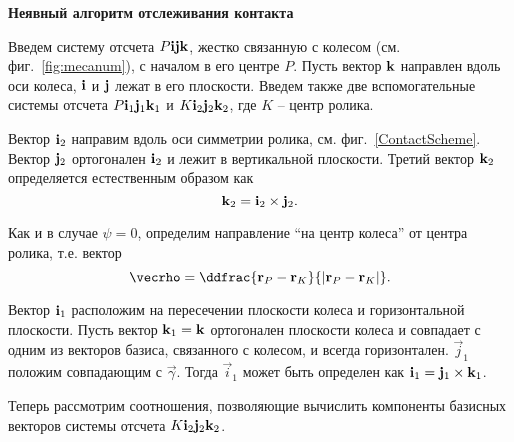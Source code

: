 \textbf{Неявный алгоритм отслеживания контакта}

Введем систему отсчета $P{\bf i}{\bf j}{\bf k}$, жестко связанную с колесом (см. фиг.~\ref{fig:mecanum}), с началом в его центре $P$. Пусть вектор ${\bf k}$ направлен вдоль оси колеса, ${\bf i}$ и ${\bf j}$ лежат в его плоскости. Введем также две вспомогательные системы отсчета $P{\bf i}_1{\bf j}_1{\bf k}_1$ и $K{\bf i}_2{\bf j}_2{\bf k}_2$, где $K$ -- центр ролика.

Вектор ${\bf i}_2$ направим вдоль оси симметрии ролика, см. фиг.~\ref{ContactScheme}. Вектор ${\bf j}_2$ ортогонален ${\bf i}_2$ и лежит в вертикальной плоскости. Третий вектор ${\bf k}_2$ определяется естественным образом как
$$
{\bf k}_2={\bf i}_2\times {\bf j}_2.
$$



Как и в случае $\psi = 0$, определим направление ``на центр колеса'' от центра ролика, т.е. вектор
$$
    \vecrho = \ddfrac
        { {\bf r}_{P}-{\bf r}_{K} }
        {\left| {\bf r}_{P}-{\bf r}_{K} \right|}.
$$

Вектор ${\bf i}_1$ расположим на пересечении плоскости колеса и горизонтальной плоскости. Пусть вектор ${\bf k}_1 = {\bf k}$ ортогонален плоскости колеса и совпадает с одним из векторов базиса, связанного с колесом, и всегда горизонтален. 
$\vec{j}_1$ положим совпадающим с $\vec{\gamma}$. Тогда $\vec{i}_1$ может быть определен как ${\bf i}_1 = {\bf j}_1 \times {\bf k}_1$.

Теперь рассмотрим соотношения, позволяющие вычислить компоненты базисных векторов системы отсчета $K{\bf i}_2{\bf j}_2{\bf k}_2$.

